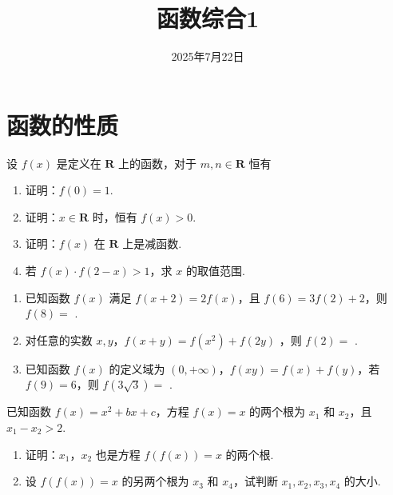 \documentclass[a4paper , final]{ctexart}
\title{函数综合1}
\date{2025年7月22日}
\newenvironment{problem}[1]{%
  \item #1
  \par
  \vspace{8cm}
}{}
\begin{document}
\maketitle

\section*{函数的性质}

\begin{problems}
    \begin{problem}
        {
            设 $ f(x)$ 是定义在 $ \mathbf{R}$ 上的函数，对于 $m,n\in \mathbf{R}$ 恒有 %
            \begin{enumerate}[label=(\arabic*)]
                \item 证明：$ f(0) = 1$.
                \item 证明：$ x\in\mathbf{R}$ 时，恒有 $ f(x) >0$.
                \item 证明：$ f(x)$ 在 $ \mathbf{R}$ 上是减函数.
                \item 若 $f(x)\cdot f(2-x)>1$，求 $ x$ 的取值范围.
            \end{enumerate}
        }
    \end{problem}

    \begin{problem}
        {
            \begin{enumerate}[label=(\arabic*)]
                \item 已知函数 $ f(x)$ 满足 $f(x+2) = 2f(x)$，且 $f(6) = 3f(2)+2$，则 $f(8)=$ \underline{\hspace{1.5cm}}.
                \item 对任意的实数 $x,y$，$f(x+y)=f(x^2)+f(2y)$ ，则 $f(2)=$ \underline{\hspace{1.5cm}}.
                \item 已知函数 $ f(x)$ 的定义域为 $ (0,+\infty)$，$f(xy)=f(x)+f(y)$，若 $f(9)=6$，则 $f(3\sqrt{3})=$ \underline{\hspace{1.5cm}}.
            \end{enumerate}
        }
    \end{problem}

    \begin{problem}
        {
            已知函数 $ f(x) = x^2 +bx +c$，方程 $ f(x) = x$ 的两个根为 $ x_1$ 和 $ x_2$，且 $ x_1-x_2>2$.
            \begin{enumerate}[label=(\arabic*)]
                \item 证明：$ x_1$，$ x_2$ 也是方程 $ f(f(x)) =x$ 的两个根.
                \item 设 $ f(f(x)) = x$ 的另两个根为 $ x_3$ 和 $ x_4$，试判断 $ x_1, x_2, x_3, x_4$ 的大小.
            \end{enumerate}
        }
    \end{problem}


\end{problems}
\end{document}
